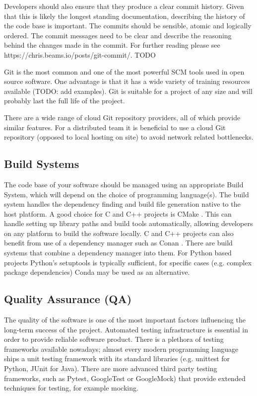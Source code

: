 \documentclass[jnr]{iosart2x}
\begin{document}
Developers should also ensure that they produce a clear commit history.
Given that this is likely the longest standing documentation, describing the history of the code base is important.
The commits should be sensible, atomic and logically ordered.
The commit messages need to be clear and describe the reasoning behind the changes made in the commit.
For further reading please see https://chris.beams.io/posts/git-commit/. TODO

Git \cite{Git} is the most common and one of the most powerful SCM tools used in open source software.
One advantage is that it has a wide variety of training resources available (TODO: add examples).
Git is suitable for a project of any size and will probably last the full life of the project.

There are a wide range of cloud Git repository providers, all of which provide similar features.
For a distributed team it is beneficial to use a cloud Git repository (opposed to local hosting on site) to avoid network related bottlenecks.

\subsection{Build Systems}
\label{Build systems}

The code base of your software should be managed using an appropriate Build System, which will depend on the choice of programming language(s).
The build system handles the dependency finding and build file generation native to the host platform.
A good choice for C and C++ projects is CMake \cite{CMake}.
This can handle setting up library paths and build tools automatically, allowing developers on any platform to build the software locally.
C and C++ projects can also benefit from use of a dependency manager such as Conan \cite{Conan}.
There are build systems that combine a dependency manager into them.
For Python based projects Python's setuptools is typically sufficient, for specific cases (e.g. complex package dependencies) Conda may be used as an alternative.

\subsection{Quality Assurance (QA)}
\label{Quality assurance}

The quality of the software is one of the most important factors influencing the long-term success of the project.
Automated testing infrastructure is essential in order to provide reliable software product.
There is a plethora of testing frameworks available nowadays; almost every modern programming language ships a unit testing framework with its standard libraries (e.g. {\sc unittest} for {\sc Python}, {\sc JUnit} for {\sc Java}). 
There are more advanced third party testing frameworks, such as {\sc Pytest}, {\sc GoogleTest} or {\sc GoogleMock}) that provide extended techniques for testing, for example mocking.
\end{document}
